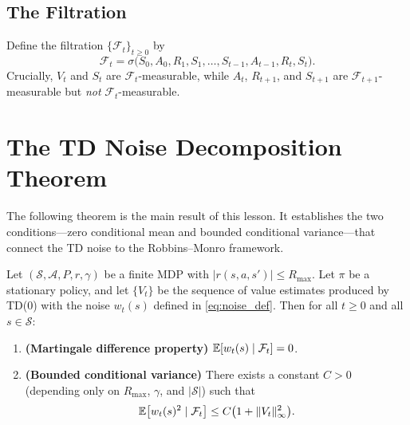 \documentclass[11pt,a4paper]{article}
\begin{document}
\subsection{The Filtration}

\begin{definition}
\label{def:filtration}
Define the filtration
$\{\mathcal{F}_t\}_{t \geq 0}$ by
\begin{equation}
  \mathcal{F}_t
  = \sigma\bigl(S_0, A_0, R_1, S_1, \ldots,
    S_{t-1}, A_{t-1}, R_t, S_t\bigr).
  \label{eq:filtration}
\end{equation}
Crucially, $V_t$ and $S_t$ are $\mathcal{F}_t$-measurable,
while $A_t$, $R_{t+1}$, and $S_{t+1}$ are
$\mathcal{F}_{t+1}$-measurable but \emph{not}
$\mathcal{F}_t$-measurable.
\end{definition}


\section{The TD Noise Decomposition Theorem}
\label{sec:decomposition}

The following theorem is the main result of this lesson.  It
establishes the two conditions---zero conditional mean and
bounded conditional variance---that connect the TD noise to
the Robbins--Monro framework.

\begin{theorem}
\label{thm:td_noise}
Let $(\mathcal{S}, \mathcal{A}, P, r, \gamma)$ be a finite
MDP with $|r(s,a,s')| \leq R_{\max}$.  Let $\pi$ be a
stationary policy, and let $\{V_t\}$ be the sequence of value
estimates produced by TD(0) with the noise $w_t(s)$ defined
in \eqref{eq:noise_def}.  Then for all $t \geq 0$ and all
$s \in \mathcal{S}$:
\begin{enumerate}
  \item \textbf{(Martingale difference property)}
    $\mathbb{E}[w_t(s) \mid \mathcal{F}_t] = 0$.
  \item \textbf{(Bounded conditional variance)}
    There exists a constant $C > 0$ (depending only on
    $R_{\max}$, $\gamma$, and $|\mathcal{S}|$) such that
    \begin{equation}
      \mathbb{E}\bigl[w_t(s)^2 \mid \mathcal{F}_t\bigr]
      \leq C\bigl(1 + \|V_t\|_\infty^2\bigr).
      \label{eq:variance_bound}
    \end{equation}
\end{enumerate}
\end{theorem}
\end{document}
